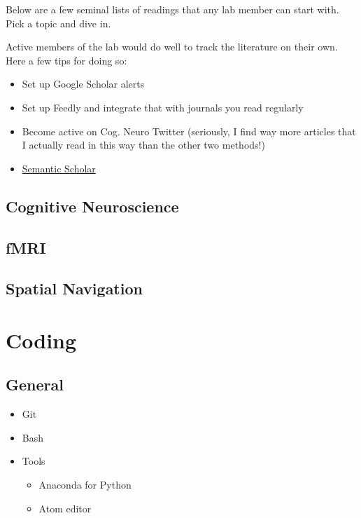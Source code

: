 \documentclass[
  12pt,
]{book}
\begin{document}
Below are a few seminal lists of readings that any lab member can start with. Pick a topic and dive in.

Active members of the lab would do well to track the literature on their own. Here a few tips for doing so:

\begin{itemize}
\item
  Set up Google Scholar alerts
\item
  Set up Feedly and integrate that with journals you read regularly
\item
  Become active on Cog. Neuro Twitter (seriously, I find way more articles that I actually read in this way than the other two methods!)
\item
  \href{https://www.semanticscholar.org/}{Semantic Scholar}
\end{itemize}

\hypertarget{cognitive-neuroscience}{%
\subsection{Cognitive Neuroscience}\label{cognitive-neuroscience}}

\hypertarget{fmri}{%
\subsection{fMRI}\label{fmri}}

\hypertarget{spatial-navigation}{%
\subsection{Spatial Navigation}\label{spatial-navigation}}

\hypertarget{coding}{%
\section{Coding}\label{coding}}

\hypertarget{general}{%
\subsection{General}\label{general}}

\begin{itemize}
\item
  Git
\item
  Bash
\item
  Tools

  \begin{itemize}
  \item
    Anaconda for Python
  \item
    Atom editor
  \end{itemize}
\end{itemize}
\end{document}
